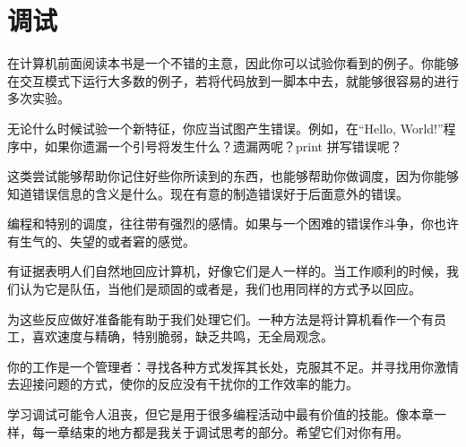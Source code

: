 \section{调试}
在计算机前面阅读本书是一个不错的主意，因此你可以试验你看到的例子。你能够在交互模式下运行大多数的例子，若将代码放到一脚本中去，就能够很容易的进行多次实验。

无论什么时候试验一个新特征，你应当试图产生错误。例如，在“Hello, World!”程序中，如果你遗漏一个引号将发生什么？遗漏两呢？print 拼写错误呢？

这类尝试能够帮助你记住好些你所读到的东西，也能够帮助你做调度，因为你能够知道错误信息的含义是什么。现在有意的制造错误好于后面意外的错误。

编程和特别的调度，往往带有强烈的感情。如果与一个困难的错误作斗争，你也许有生气的、失望的或者窘的感觉。

有证据表明人们自然地回应计算机，好像它们是人一样的。当工作顺利的时候，我们认为它是队伍，当他们是顽固的或者是，我们也用同样的方式予以回应。

为这些反应做好准备能有助于我们处理它们。一种方法是将计算机看作一个有员工，喜欢速度与精确，特别脆弱，缺乏共鸣，无全局观念。

你的工作是一个管理者：寻找各种方式发挥其长处，克服其不足。并寻找用你激情去迎接问题的方式，使你的反应没有干扰你的工作效率的能力。

学习调试可能令人沮丧，但它是用于很多编程活动中最有价值的技能。像本章一样，每一章结束的地方都是我关于调试思考的部分。希望它们对你有用。

\endinput